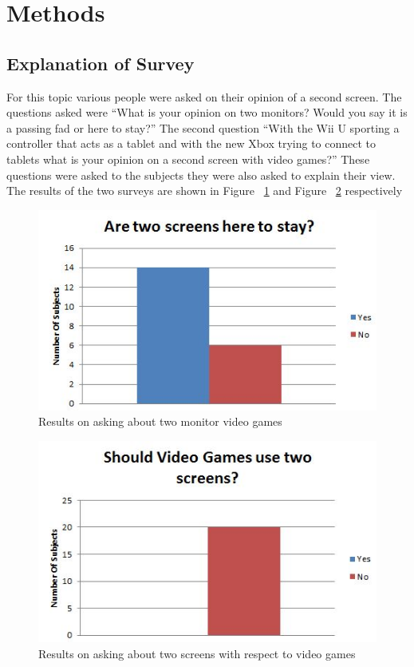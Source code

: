 \documentclass[11pt]{article}
\begin{document}
\section{Methods}
\subsection{Explanation of Survey}
For this topic various people were asked on their opinion of a second screen. The questions asked were “What is your opinion on two monitors? Would you say it is a passing fad or here to stay?” The second question “With the Wii U sporting a controller that acts as a tablet and with the new Xbox trying to connect to tablets what is your opinion on a second screen with video games?” These questions were asked to the subjects they were also asked to explain their view. The results of the two surveys are shown in Figure ~\ref{monitor} and Figure ~\ref{Videogames} respectively

\begin{figure}[h!]
  \centering
    \includegraphics[width= 1\textwidth]{./Images/Monitors}
  \caption{Results on asking about two monitor video games}
 \label{monitor}
\end{figure}

\begin{figure}[h!]
  \centering
    \includegraphics[width= 1\textwidth]{./Images/VideoGames}
  \caption{Results on asking about two screens with respect to video games}
 \label{Videogames}
\end{figure}
\end{document}
